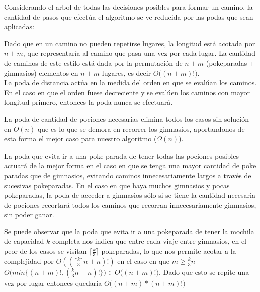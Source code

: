 Considerando el arbol de todas las decisiones posibles para formar un camino, la cantidad de pasos que efectúa el algoritmo se ve reducida por las podas que sean aplicadas:

Dado que en un camino no pueden repetirse lugares, la longitud está acotada por $n+m$, que representaría al camino que pasa una vez por cada lugar. La cantidad de caminos de este estilo está dada por la permutación de $n+m$ (pokeparadas + gimnasios) elementos en $n+m$ lugares, es decir $O\Big ( (n+m)! \Big)$.\\

La poda de distancia actúa en la medida del orden en que se evalúan los caminos. En el caso en que el orden fuese decreciente y se evalúen los caminos con mayor longitud primero, entonces la poda nunca se efectuará.

La poda de cantidad de pociones necesarias elimina todos los casos sin solución en $O(n)$ que es lo que se demora en recorrer los gimnasios, aportandonos de esta forma el mejor caso para nuestro algoritmo ($\Omega(n)$).

La poda que evita ir a una poke-parada de tener todas las pociones posibles actuará de la mejor forma en el caso en que se tenga una mayor cantidad de poke paradas que de gimnasios, evitando caminos innecesariamente largos a través de sucesivas pokeparadas. En el caso en que haya muchos gimnasios y pocas pokeparadas, la poda de acceder a gimnasios sólo si se tiene la cantidad necesaria de pociones recortará todos los caminos que recorran innecesariamente gimnasios, sin poder ganar. 

Se puede observar que la poda que evita ir a una pokeparada de tener la mochila de capacidad $k$ completa nos indica que entre cada viaje entre gimnasios, en el peor de los casos se visitan $\lceil{\frac{k}{3}}\rceil$ pokeparadas, lo que nos permite acotar a la complejidad por $O((\lceil{\frac{k}{3}}\rceil n + n)!)$ en el caso en que $m\geq\frac{k}{3}n$ $O\Big(min\big\{ (n+m)!, (\frac{k}{3}n + n)! \big\}\Big) \in O\big((n+m)!\big)$. Dado que esto se repite una vez por lugar entonces quedaría $O\big((n+m) * (n+m)!\big)$
 